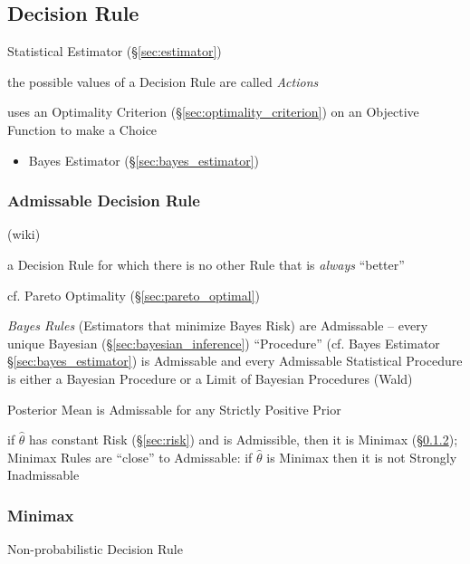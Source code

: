 \subsection{Decision Rule}\label{sec:decision_rule}

Statistical Estimator (\S\ref{sec:estimator})

the possible values of a Decision Rule are called \emph{Actions}

uses an Optimality Criterion (\S\ref{sec:optimality_criterion}) on an Objective
Function to make a Choice

\begin{itemize}
  \item Bayes Estimator (\S\ref{sec:bayes_estimator})
\end{itemize}



\subsubsection{Admissable Decision Rule}\label{sec:admissable}

(wiki)

a Decision Rule for which there is no other Rule that is \emph{always}
``better''

cf. Pareto Optimality (\S\ref{sec:pareto_optimal})

\emph{Bayes Rules} (Estimators that minimize Bayes Risk) are Admissable -- every
unique Bayesian (\S\ref{sec:bayesian_inference}) ``Procedure'' (cf. Bayes
Estimator \S\ref{sec:bayes_estimator}) is Admissable and every Admissable
Statistical Procedure is either a Bayesian Procedure or a Limit of Bayesian
Procedures (Wald)

Posterior Mean is Admissable for any Strictly Positive Prior

if $\hat{\theta}$ has constant Risk (\S\ref{sec:risk}) and is Admissible, then
it is Minimax (\S\ref{sec:minimax});
Minimax Rules are ``close'' to Admissable: if $\hat{\theta}$ is Minimax then it
is not Strongly Inadmissable



\subsubsection{Minimax}\label{sec:minimax}

Non-probabilistic Decision Rule

